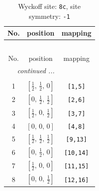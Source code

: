 \documentclass[fleqn,8pt]{jsarticle}
\begin{document}
\renewcommand{\arraystretch}{1.2}
\begin{longtable}{ccc}
\caption{Wyckoff site: {\tt 8c}, site symmetry: {\tt -1}}
 \\
 \hline \hline
No. & position & mapping \\ \hline \endfirsthead

\multicolumn{2}{l}{\tablename\ \thetable{}} \\
 \hline \hline
No. & position & mapping \\ \hline \endhead

 \hline \hline
\multicolumn{2}{r}{\footnotesize\it continued ...} \\ \endfoot

 \hline \hline
\multicolumn{2}{r}{} \\ \endlastfoot

1 & $\left[ \frac{1}{2},\, \frac{1}{2},\, 0 \right]$ & {\tt [1,5]} \\ \hline
2 & $\left[ 0,\, \frac{1}{2},\, \frac{1}{2} \right]$ & {\tt [2,6]} \\ \hline
3 & $\left[ \frac{1}{2},\, 0,\, \frac{1}{2} \right]$ & {\tt [3,7]} \\ \hline
4 & $\left[ 0,\, 0,\, 0 \right]$ & {\tt [4,8]} \\ \hline
5 & $\left[ \frac{1}{2},\, \frac{1}{2},\, \frac{1}{2} \right]$ & {\tt [9,13]} \\ \hline
6 & $\left[ 0,\, \frac{1}{2},\, 0 \right]$ & {\tt [10,14]} \\ \hline
7 & $\left[ \frac{1}{2},\, 0,\, 0 \right]$ & {\tt [11,15]} \\ \hline
8 & $\left[ 0,\, 0,\, \frac{1}{2} \right]$ & {\tt [12,16]} \\
\end{longtable}
\renewcommand{\arraystretch}{1.2}
\end{document}
